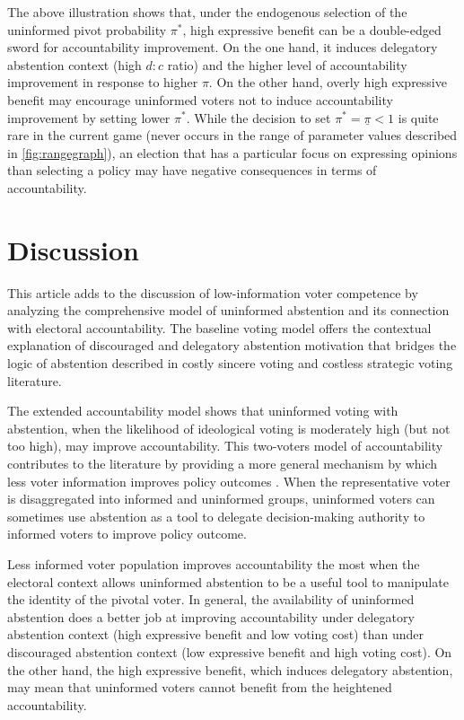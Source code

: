 \documentclass[letterpaper, 12pt]{article}
\begin{document}
    \par The above illustration shows that, under the endogenous selection of the uninformed pivot probability $\pi^*$, high expressive benefit can be a double-edged sword for accountability improvement. On the one hand, it induces delegatory abstention context (high $d:c$ ratio) and the higher level of accountability improvement in response to higher $\pi$. On the other hand, overly high expressive benefit may encourage uninformed voters not to induce accountability improvement by setting lower $\pi^*$. While the decision to set $\pi^*=\underline{\pi}<1$ is quite rare in the current game (never occurs in the range of parameter values described in \autoref{fig:rangegraph}), an election that has a particular focus on expressing opinions than selecting a policy may have negative consequences in terms of accountability.   
    
    \section*{Discussion}

    \par This article adds to the discussion of low-information voter competence by analyzing the comprehensive model of uninformed abstention and its connection with electoral accountability. The baseline voting model offers the contextual explanation of discouraged and delegatory abstention motivation that bridges the logic of abstention described in costly sincere voting \citep{Downs1957anec, Riker1968thof, Matsusaka1995exvo} and costless strategic voting \citep{Feddersen1996thsw, Feddersen1999abin} literature. 
    
    \par The extended accountability model shows that uninformed voting with abstention, when the likelihood of ideological voting is moderately high (but not too high), may improve accountability. This two-voters model of accountability contributes to the literature by providing a more general mechanism by which less voter information improves policy outcomes \citep{Ashworth2014isvo, Prato2016thvo, Couzin2011unin}. When the representative voter is disaggregated into informed and uninformed groups, uninformed voters can sometimes use abstention as a tool to delegate decision-making authority to informed voters to improve policy outcome. 
    
    \par Less informed voter population improves accountability the most when the electoral context allows uninformed abstention to be a useful tool to manipulate the identity of the pivotal voter. In general, the availability of uninformed abstention does a better job at improving accountability under delegatory abstention context (high expressive benefit and low voting cost) than under discouraged abstention context (low expressive benefit and high voting cost). On the other hand, the high expressive benefit, which induces delegatory abstention, may mean that uninformed voters cannot benefit from the heightened accountability.
    
\end{document}
